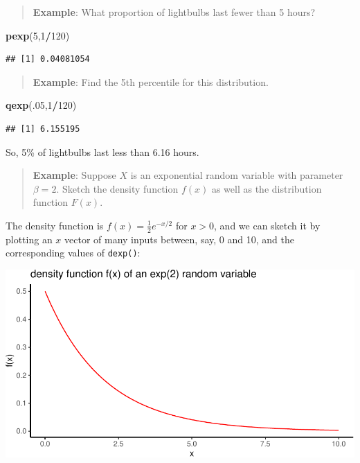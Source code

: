 \documentclass[
]{book}
\newenvironment{Shaded}{\begin{snugshade}}{\end{snugshade}}
\newcommand{\DecValTok}[1]{\textcolor[rgb]{0.00,0.00,0.81}{#1}}
\newcommand{\FunctionTok}[1]{\textcolor[rgb]{0.13,0.29,0.53}{\textbf{#1}}}
\newcommand{\NormalTok}[1]{#1}
\newcommand{\SpecialCharTok}[1]{\textcolor[rgb]{0.81,0.36,0.00}{\textbf{#1}}}
\theoremstyle{definition}
\theoremstyle{definition}
\theoremstyle{definition}
\theoremstyle{definition}
\theoremstyle{remark}
\begin{document}
\begin{quote}
\textbf{Example}: What proportion of lightbulbs last fewer than 5 hours?
\end{quote}

\begin{Shaded}
\begin{Highlighting}[]
\FunctionTok{pexp}\NormalTok{(}\DecValTok{5}\NormalTok{,}\DecValTok{1}\SpecialCharTok{/}\DecValTok{120}\NormalTok{)}
\end{Highlighting}
\end{Shaded}

\begin{verbatim}
## [1] 0.04081054
\end{verbatim}

\begin{quote}
\textbf{Example}: Find the 5th percentile for this distribution.
\end{quote}

\begin{Shaded}
\begin{Highlighting}[]
\FunctionTok{qexp}\NormalTok{(.}\DecValTok{05}\NormalTok{,}\DecValTok{1}\SpecialCharTok{/}\DecValTok{120}\NormalTok{)}
\end{Highlighting}
\end{Shaded}

\begin{verbatim}
## [1] 6.155195
\end{verbatim}

So, 5\% of lightbulbs last less than 6.16 hours.

\begin{quote}
\textbf{Example}: Suppose \(X\) is an exponential random variable with parameter \(\beta = 2\). Sketch the density function \(f(x)\) as well as the distribution function \(F(x)\).
\end{quote}

The density function is \(f(x) = \frac{1}{2}e^{-x/2}\) for \(x > 0\), and we can sketch it by plotting an \(x\) vector of many inputs between, say, 0 and 10, and the corresponding values of \texttt{dexp()}:

\begin{center}\includegraphics{math340-notes_files/figure-latex/unnamed-chunk-181-1} \end{center}
\end{document}
